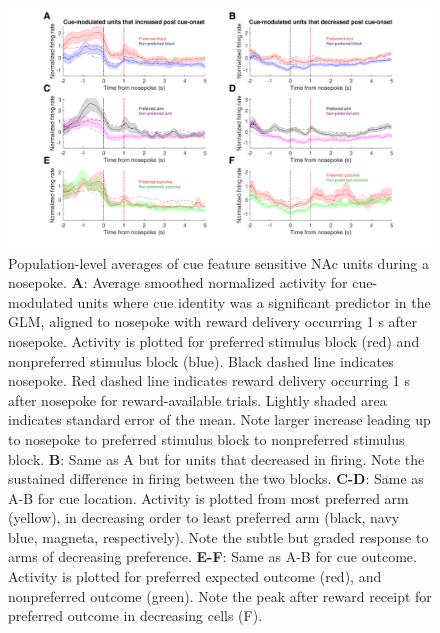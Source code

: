 \documentclass[11pt]{article}
\newcommand{\bsf}[1]{\textbf{#1}}
\begin{document}
{\begin{figure}[h]
\centering
\includegraphics[width=\textwidth]{Fig 11 - NP population averages.png}
\caption{Population-level averages of cue feature sensitive NAc units during a
  nosepoke. \bsf{A}: Average smoothed normalized activity for cue-modulated
  units where cue identity was a significant predictor in the GLM, aligned to
  nosepoke with reward delivery occurring 1 s after nosepoke. Activity is
  plotted for preferred stimulus block (red) and nonpreferred stimulus block
  (blue). Black dashed line indicates nosepoke. Red dashed line indicates reward
  delivery occurring 1 s after nosepoke for reward-available trials. Lightly
  shaded area indicates standard error of the mean. Note larger increase leading
  up to nosepoke to preferred stimulus block to nonpreferred stimulus
  block. \bsf{B}: Same as A but for units that decreased in firing. Note the
  sustained difference in firing between the two blocks. \bsf{C-D}: Same as A-B
  for cue location. Activity is plotted from most preferred arm (yellow), in
  decreasing order to least preferred arm (black, navy blue, magneta,
  respectively). Note the subtle but graded response to arms of decreasing
  preference. \bsf{E-F}: Same as A-B for cue outcome. Activity is plotted for
  preferred expected outcome (red), and nonpreferred outcome (green). Note the
  peak after reward receipt for preferred outcome in decreasing cells (F).}
\label{fig:NP_pop}
\end{figure}

}
\end{document}
